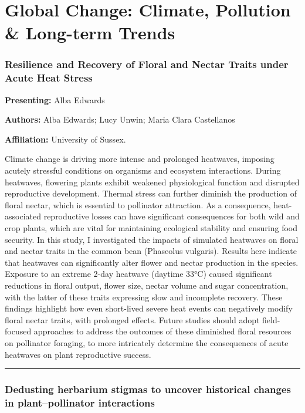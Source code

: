 \documentclass[
  letterpaper,
  DIV=11,
  numbers=noendperiod]{scrartcl}
\begin{document}
\section{Global Change: Climate, Pollution \& Long-term
Trends}\label{global-change-climate-pollution-long-term-trends}

\subsubsection{Resilience and Recovery of Floral and Nectar Traits under
Acute Heat
Stress}\label{resilience-and-recovery-of-floral-and-nectar-traits-under-acute-heat-stress}

\textbf{Presenting:} Alba Edwards

\textbf{Authors:} Alba Edwards; Lucy Unwin; Maria Clara Castellanos

\textbf{Affiliation:} University of Sussex.

Climate change is driving more intense and prolonged heatwaves, imposing
acutely stressful conditions on organisms and ecosystem interactions.
During heatwaves, flowering plants exhibit weakened physiological
function and disrupted reproductive development. Thermal stress can
further diminish the production of floral nectar, which is essential to
pollinator attraction. As a consequence, heat-associated reproductive
losses can have significant consequences for both wild and crop plants,
which are vital for maintaining ecological stability and ensuring food
security. In this study, I investigated the impacts of simulated
heatwaves on floral and nectar traits in the common bean (Phaseolus
vulgaris). Results here indicate that heatwaves can significantly alter
flower and nectar production in the species. Exposure to an extreme
2-day heatwave (daytime 33°C) caused significant reductions in floral
output, flower size, nectar volume and sugar concentration, with the
latter of these traits expressing slow and incomplete recovery. These
findings highlight how even short-lived severe heat events can
negatively modify floral nectar traits, with prolonged effects. Future
studies should adopt field-focused approaches to address the outcomes of
these diminished floral resources on pollinator foraging, to more
intricately determine the consequences of acute heatwaves on plant
reproductive success.

\begin{center}\rule{0.5\linewidth}{0.5pt}\end{center}

\subsubsection{Dedusting herbarium stigmas to uncover historical changes
in plant--pollinator
interactions}\label{dedusting-herbarium-stigmas-to-uncover-historical-changes-in-plantpollinator-interactions}
\end{document}
